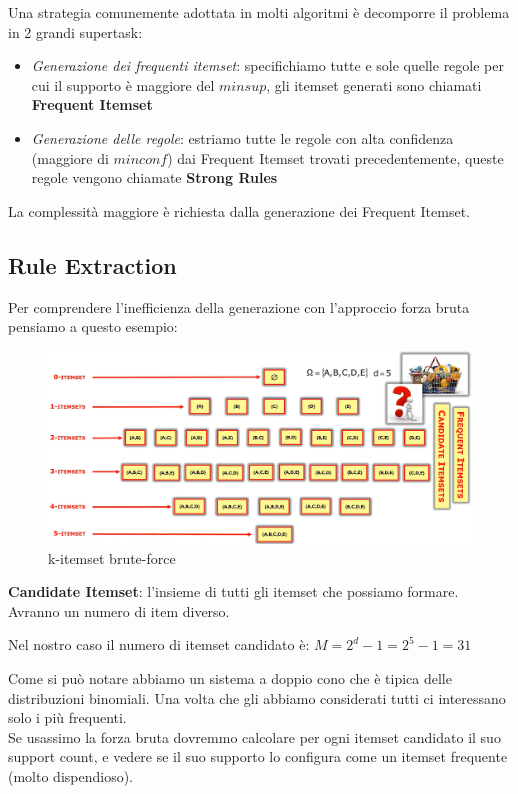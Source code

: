 Una strategia comunemente adottata in molti algoritmi \`e decomporre il problema in 2 grandi supertask:
\begin{itemize}
	\item\textit{Generazione dei frequenti itemset}: specifichiamo tutte e sole quelle regole per cui il supporto è maggiore del $minsup$, gli itemset generati sono chiamati \textbf{Frequent Itemset}
	\item \textit{Generazione delle regole}: estriamo tutte le regole con alta confidenza (maggiore di $minconf$) dai Frequent Itemset trovati precedentemente, queste regole vengono chiamate \textbf{Strong Rules}
\end{itemize}
\noindent
La complessità maggiore è richiesta dalla generazione dei Frequent Itemset.


\subsection{Rule Extraction}

Per comprendere l'inefficienza della generazione con l'approccio forza bruta pensiamo a questo esempio:
\begin{figure}[H]
	\hspace{-0.7 cm}
	\includegraphics[height=0.5 \linewidth]{association/pict/k-itemset.png}
	\caption{k-itemset brute-force}
\end{figure}
\begin{defn}
	\textbf{Candidate Itemset}: l'insieme di tutti gli itemset che possiamo formare. Avranno un numero di item diverso. 
\end{defn}
Nel nostro caso il numero di itemset candidato è: $M = 2^{d} - 1 = 2^5 -1 = 31$

Come si può notare abbiamo un sistema a doppio cono che è tipica delle distribuzioni binomiali. Una volta che gli abbiamo considerati tutti ci interessano solo i più frequenti. \\
Se usassimo la forza bruta dovremmo calcolare per ogni itemset candidato il suo support count, e vedere se il suo supporto lo configura come un itemset frequente (molto dispendioso). 


